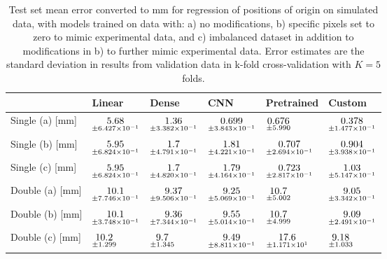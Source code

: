 \begin{table}
\centering
\caption{
Test set mean error converted to mm for regression of positions of origin on simulated data, with models trained on data with: 
a) no modifications, b) specific pixels set to zero to mimic experimental data, and c) imbalanced dataset
in addition to modifications in b) to further mimic experimental data. Error estimates are the standard deviation 
in results from validation data in k-fold cross-validation with $K=5$ folds.
}
\label{tab:regression-simulated-all-positions-mse}
\begin{tabular}{llllll}
\toprule
{} &                                             Linear &                                              Dense &                                                 CNN &                                          Pretrained &                                              Custom \\
\midrule
Single (a) [mm] &  $\underset{\num{+- 6.427e-01 }  }{\num{ 5.68 } }$ &  $\underset{\num{+- 3.382e-01 }  }{\num{ 1.36 } }$ &  $\underset{\num{+- 3.843e-01 }  }{\num{ 0.699 } }$ &  $\underset{\num{+- 5.990e+00 }  }{\num{ 0.676 } }$ &  $\underset{\num{+- 1.477e-01 }  }{\num{ 0.378 } }$ \\
Single (b) [mm] &  $\underset{\num{+- 6.824e-01 }  }{\num{ 5.95 } }$ &  $\underset{\num{+- 4.791e-01 }  }{\num{ 1.7 } }$ &  $\underset{\num{+- 4.221e-01 }  }{\num{ 1.81 } }$ &  $\underset{\num{+- 2.694e-01 }  }{\num{ 0.707 } }$ &  $\underset{\num{+- 3.938e-01 }  }{\num{ 0.904 } }$ \\
Single (c) [mm] &  $\underset{\num{+- 6.824e-01 }  }{\num{ 5.95 } }$ &  $\underset{\num{+- 4.820e-01 }  }{\num{ 1.7 } }$ &  $\underset{\num{+- 4.164e-01 }  }{\num{ 1.79 } }$ &  $\underset{\num{+- 2.817e-01 }  }{\num{ 0.723 } }$ &  $\underset{\num{+- 5.147e-01 }  }{\num{ 1.03 } }$ \\
Double (a) [mm] &  $\underset{\num{+- 7.746e-01 }  }{\num{ 10.1 } }$ &  $\underset{\num{+- 9.506e-01 }  }{\num{ 9.37 } }$ &  $\underset{\num{+- 5.069e-01 }  }{\num{ 9.25 } }$ &  $\underset{\num{+- 5.002e+00 }  }{\num{ 10.7 } }$ &  $\underset{\num{+- 3.342e-01 }  }{\num{ 9.05 } }$ \\
Double (b) [mm] &  $\underset{\num{+- 3.748e-01 }  }{\num{ 10.1 } }$ &  $\underset{\num{+- 7.344e-01 }  }{\num{ 9.36 } }$ &  $\underset{\num{+- 5.014e-01 }  }{\num{ 9.55 } }$ &  $\underset{\num{+- 4.999e+00 }  }{\num{ 10.7 } }$ &  $\underset{\num{+- 2.491e-01 }  }{\num{ 9.09 } }$ \\
Double (c) [mm] &  $\underset{\num{+- 1.299e+00 }  }{\num{ 10.2 } }$ &  $\underset{\num{+- 1.345e+00 }  }{\num{ 9.7 } }$ &  $\underset{\num{+- 8.811e-01 }  }{\num{ 9.49 } }$ &  $\underset{\num{+- 1.171e+01 }  }{\num{ 17.6 } }$ &  $\underset{\num{+- 1.033e+00 }  }{\num{ 9.18 } }$ \\
\bottomrule
\end{tabular}
\end{table}